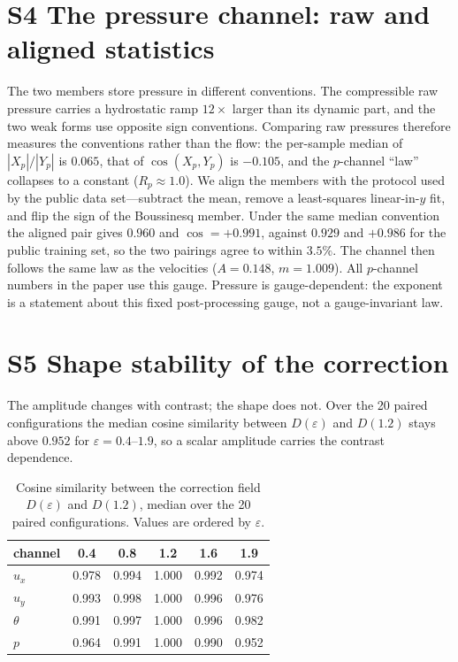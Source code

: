 \documentclass[preprint,11pt,a4paper,times,doubleblind]{elsarticle}
\begin{document}
\section*{S4 The pressure channel: raw and aligned statistics}
\label{sec:pressure-supp}

The two members store pressure in different conventions. The compressible raw pressure carries a
hydrostatic ramp $12\times$ larger than its dynamic part, and the two weak forms use opposite
sign conventions. Comparing raw pressures therefore measures the conventions rather than the flow:
the per-sample median of $|X_p|/|Y_p|$ is $0.065$, that of $\cos(X_p,Y_p)$ is $-0.105$, and the
$p$-channel ``law'' collapses to a constant ($R_p\approx1.0$). We align the members with the
protocol used by the public data set---subtract the mean, remove a least-squares linear-in-$y$ fit,
and flip the sign of the Boussinesq member. Under the same median convention the aligned pair gives
$0.960$ and $\cos=+0.991$, against $0.929$ and $+0.986$ for the public training set, so the two
pairings agree to within $3.5\%$. The channel then follows the same law as the velocities
($A=0.148$, $m=1.009$). All $p$-channel numbers in the paper use this gauge. Pressure is
gauge-dependent: the exponent is a statement about this fixed post-processing gauge, not a
gauge-invariant law.

\section*{S5 Shape stability of the correction}
The amplitude changes with contrast; the shape does not. Over the 20 paired configurations the
median cosine similarity between $D(\varepsilon)$ and $D(1.2)$ stays above $0.952$ for
$\varepsilon=0.4$--$1.9$, so a scalar amplitude carries the contrast dependence.

\begin{table}[htbp]
\centering
\small
\caption{Cosine similarity between the correction field $D(\varepsilon)$ and $D(1.2)$, median
over the 20 paired configurations. Values are ordered by $\varepsilon$.}
\label{tab:shape}
\begin{tabular}{@{}lccccc@{}}
\toprule
channel & 0.4 & 0.8 & 1.2 & 1.6 & 1.9\\
\midrule
$u_x$ & 0.978 & 0.994 & 1.000 & 0.992 & 0.974\\
$u_y$ & 0.993 & 0.998 & 1.000 & 0.996 & 0.976\\
$\theta$ & 0.991 & 0.997 & 1.000 & 0.996 & 0.982\\
$p$ & 0.964 & 0.991 & 1.000 & 0.990 & 0.952\\
\bottomrule
\end{tabular}
\end{table}
\end{document}
